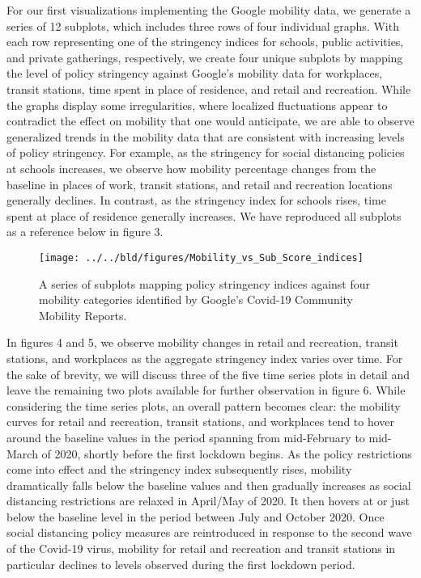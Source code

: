 For our first visualizations implementing the Google mobility data, we generate a series of 12 subplots, which includes three rows of four individual graphs. With each row representing one of the stringency indices for schools, public activities, and private gatherings, respectively, we create four unique subplots by mapping the level of policy stringency against Google’s mobility data for workplaces, transit stations, time spent in place of residence, and retail and recreation. While the graphs display some irregularities, where localized fluctuations appear to contradict the effect on mobility that one would anticipate, we are able to observe generalized trends in the mobility data that are consistent with increasing levels of policy stringency. For example, as the stringency for social distancing policies at schools increases, we observe how mobility percentage changes from the baseline in places of work, transit stations, and retail and recreation locations generally declines. In contrast, as the stringency index for schools rises, time spent at place of residence generally increases. We have reproduced all subplots as a reference below in figure 3.

\begin{figure}[H]
      \centering
      \texttt{[image: ../../bld/figures/Mobility\_vs\_Sub\_Score\_indices]}
      \caption{A series of subplots mapping policy stringency indices against four mobility categories identified by Google's Covid-19 Community Mobility Reports.}
      \label{fig:mobilitydeviations}
\end{figure}

In figures 4 and 5, we observe mobility changes in retail and recreation, transit stations, and workplaces as the aggregate stringency index varies over time. For the sake of brevity, we will discuss three of the five time series plots in detail and leave the remaining two plots available for further observation in figure 6. While considering the time series plots, an overall pattern becomes clear: the mobility curves for retail and recreation, transit stations, and workplaces tend to hover around the baseline values in the period spanning from mid-February to mid-March of 2020, shortly before the first lockdown begins. As the policy restrictions come into effect and the stringency index subsequently rises, mobility dramatically falls below the baseline values and then gradually increases as social distancing restrictions are relaxed in April/May of 2020. It then hovers at or just below the baseline level in the period between July and October 2020. Once social distancing policy measures are reintroduced in response to the second wave of the Covid-19 virus, mobility for retail and recreation and transit stations in particular declines to levels observed during the first lockdown period.

